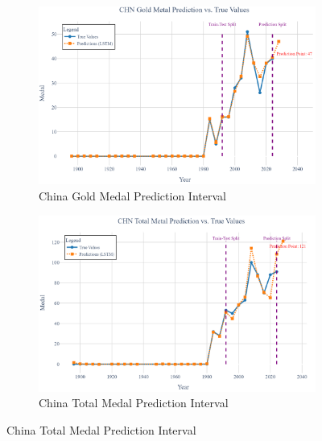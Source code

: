 \documentclass{mcmthesis}
\begin{document}
\begin{figure}[H]
	\centering
	\begin{subfigure}[b]{0.48\textwidth}
		\includegraphics[width=\textwidth]{fig/CHN_gold.png}
		\caption{China Gold Medal Prediction Interval}
		\label{fig:chn_gold1}
	\end{subfigure}
	\hfill
	\begin{subfigure}[b]{0.48\textwidth}
		\includegraphics[width=\textwidth]{fig/CHN_total.png}
		\caption{China Total Medal Prediction Interval}
		\label{fig:chn_total1}
	\end{subfigure}
	

\end{figure}
\end{document}
